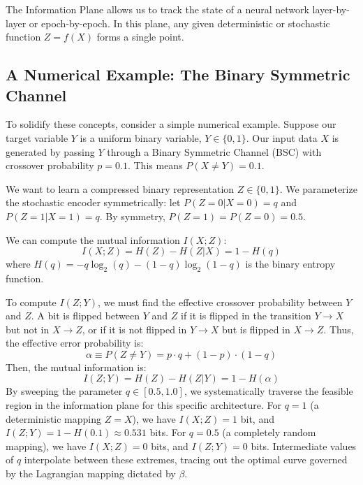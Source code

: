 The Information Plane allows us to track the state of a neural network layer-by-layer or epoch-by-epoch. In this plane, any given deterministic or stochastic function $Z = f(X)$ forms a single point. 

\subsection{A Numerical Example: The Binary Symmetric Channel}

To solidify these concepts, consider a simple numerical example. Suppose our target variable $Y$ is a uniform binary variable, $Y \in \{0, 1\}$. Our input data $X$ is generated by passing $Y$ through a Binary Symmetric Channel (BSC) with crossover probability $p = 0.1$. This means $P(X \neq Y) = 0.1$. 

We want to learn a compressed binary representation $Z \in \{0, 1\}$. We parameterize the stochastic encoder symmetrically: let $P(Z=0 | X=0) = q$ and $P(Z=1 | X=1) = q$. By symmetry, $P(Z=1) = P(Z=0) = 0.5$.

We can compute the mutual information $I(X; Z)$:
\begin{equation}
    I(X; Z) = H(Z) - H(Z|X) = 1 - H(q)
\end{equation}
where $H(q) = -q \log_2(q) - (1-q) \log_2(1-q)$ is the binary entropy function. 

To compute $I(Z; Y)$, we must find the effective crossover probability between $Y$ and $Z$. A bit is flipped between $Y$ and $Z$ if it is flipped in the transition $Y \to X$ but not in $X \to Z$, or if it is not flipped in $Y \to X$ but is flipped in $X \to Z$. Thus, the effective error probability is:
\begin{equation}
    \alpha \equiv P(Z \neq Y) = p \cdot q + (1-p) \cdot (1-q)
\end{equation}
Then, the mutual information is:
\begin{equation}
    I(Z; Y) = H(Z) - H(Z|Y) = 1 - H(\alpha)
\end{equation}
By sweeping the parameter $q \in [0.5, 1.0]$, we systematically traverse the feasible region in the information plane for this specific architecture. For $q=1$ (a deterministic mapping $Z=X$), we have $I(X;Z) = 1$ bit, and $I(Z;Y) = 1 - H(0.1) \approx 0.531$ bits. For $q=0.5$ (a completely random mapping), we have $I(X;Z) = 0$ bits, and $I(Z;Y) = 0$ bits. Intermediate values of $q$ interpolate between these extremes, tracing out the optimal curve governed by the Lagrangian mapping dictated by $\beta$.

